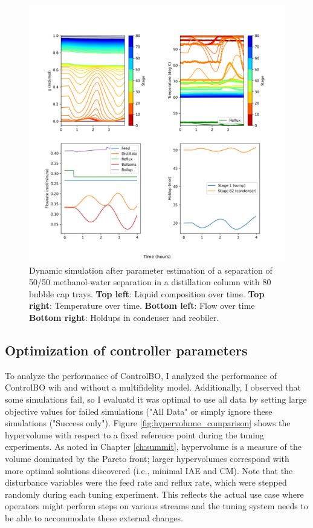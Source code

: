 \begin{figure}
    \centering
    \includegraphics[width=\textwidth]{gfx/Chapter06/2021_11_17_closed_loop_dynamic.png}
    \caption{Dynamic simulation after parameter estimation of a separation of 50/50 methanol-water separation in a distillation column with 80 bubble cap trays. \textbf{Top left}: Liquid composition over time. \textbf{Top right}: Temperature over time. \textbf{Bottom left}: Flow over time \textbf{Bottom right}: Holdups in condenser and reobiler.}
    \label{fig:dynamic_nominal}
\end{figure}


\subsection{Optimization of controller parameters}

To analyze the performance of ControlBO, I analyzed the performance of ControlBO wih and without a multifidelity model. Additionally, I observed that some simulations fail, so I evaluatd it was optimal to use all data by setting large objective values for failed simulations ("All Data" or simply ignore these simulations ("Success only").  Figure \ref{fig:hypervolume_comparison} shows the hypervolume with respect to a fixed reference point during the tuning experiments. As noted in Chapter \ref{ch:summit}, hypervolume is a measure of the volume dominated by the Pareto front; larger hypervolumes correspond with more optimal solutions discovered (i.e., minimal IAE and CM). Note that the disturbance variables were the feed rate and reflux rate, which were stepped randomly during each tuning experiment. This reflects the actual use case where operators might perform steps on various streams and the tuning system needs to be able to accommodate these external changes. 

